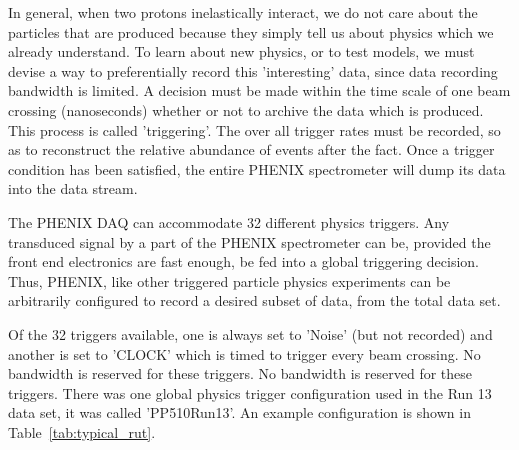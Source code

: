 In general, when two protons inelastically interact, we do not care about the
particles that are produced because they simply tell us about physics which we
already understand. To learn about new physics, or to test models, we must
devise a way to preferentially record this 'interesting'  data, since data
recording bandwidth is limited. A decision must be made within the time scale of
one beam crossing (nanoseconds) whether or not to archive the data which is
produced. This process is called 'triggering'. The over all trigger rates must
be recorded, so as to reconstruct the relative abundance of events after the
fact. Once a trigger condition has been satisfied, the entire PHENIX
spectrometer will dump its data into the data stream.

The PHENIX DAQ can accommodate 32 different physics triggers. Any transduced
signal by a part of the PHENIX spectrometer can be, provided the front end
electronics are fast enough, be fed into a global triggering decision. Thus,
PHENIX, like other triggered particle physics experiments can be arbitrarily
configured to record a desired subset of data, from the total data set.

Of the 32 triggers available, one is always set to 'Noise' (but not recorded)
and another is set to 'CLOCK' which is timed to trigger every beam crossing. No
bandwidth is reserved for these triggers. No bandwidth is reserved for these
triggers. There was one global physics trigger configuration used in the Run 13
data set, it was called 'PP510Run13'. An example configuration is shown in
Table~\ref{tab:typical_rut}.

